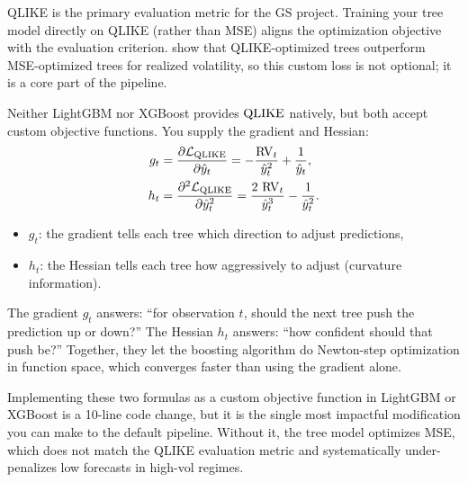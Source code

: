 \begin{projectconnection}
QLIKE is the primary evaluation metric for the GS project.  Training your
tree model directly on QLIKE (rather than MSE) aligns the optimization
objective with the evaluation criterion.
\citet{AudrinoKnaus2016} show that QLIKE-optimized trees outperform
MSE-optimized trees for realized volatility, so this custom loss is not
optional; it is a core part of the pipeline.
\end{projectconnection}

Neither LightGBM nor XGBoost provides $\operatorname{QLIKE}$ natively, but both accept
custom objective functions.  You supply the gradient and Hessian:
\begin{align}
  g_t &= \frac{\partial \mathcal{L}_{\operatorname{QLIKE}}}{\partial \hat{y}_t}
       = -\frac{\operatorname{RV}_t}{\hat{y}_t^2} + \frac{1}{\hat{y}_t}, \label{eq:trees:qlike_grad}\\
  h_t &= \frac{\partial^2 \mathcal{L}_{\operatorname{QLIKE}}}{\partial \hat{y}_t^2}
       = \frac{2\,\operatorname{RV}_t}{\hat{y}_t^3} - \frac{1}{\hat{y}_t^2}. \label{eq:trees:qlike_hess}
\end{align}
\begin{itemize}[nosep]
  \item $g_t$: the gradient tells each tree which direction to adjust
        predictions,
  \item $h_t$: the Hessian tells each tree how aggressively to adjust
        (curvature information).
\end{itemize}

\begin{intuition}
The gradient $g_t$ answers: ``for observation $t$, should the next tree push
the prediction up or down?''  The Hessian $h_t$ answers: ``how confident
should that push be?''  Together, they let the boosting algorithm do
Newton-step optimization in function space, which converges faster than
using the gradient alone.
\end{intuition}

\begin{projectconnection}
Implementing these two formulas as a custom objective function in LightGBM
or XGBoost is a 10-line code change, but it is the single most impactful
modification you can make to the default pipeline.  Without it, the tree
model optimizes MSE, which does not match the QLIKE evaluation metric and
systematically under-penalizes low forecasts in high-vol regimes.
\end{projectconnection}

